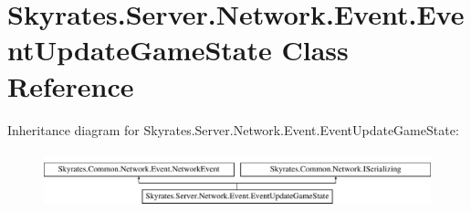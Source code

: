 \hypertarget{class_skyrates_1_1_server_1_1_network_1_1_event_1_1_event_update_game_state}{\section{Skyrates.\-Server.\-Network.\-Event.\-Event\-Update\-Game\-State Class Reference}
\label{class_skyrates_1_1_server_1_1_network_1_1_event_1_1_event_update_game_state}
}
Inheritance diagram for Skyrates.\-Server.\-Network.\-Event.\-Event\-Update\-Game\-State\-:\begin{figure}[H]
\begin{center}
\leavevmode
\includegraphics[height=1.681682cm]{class_skyrates_1_1_server_1_1_network_1_1_event_1_1_event_update_game_state}
\end{center}
\end{figure}
